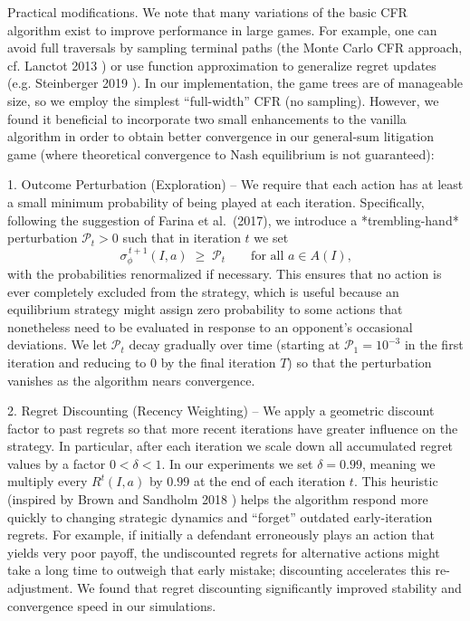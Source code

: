 \documentclass{article}
\begin{document}
Practical modifications. We note that many variations of the basic CFR algorithm exist to improve performance in large games. For example, one can avoid full traversals by sampling terminal paths (the Monte Carlo CFR approach, cf. Lanctot 2013 \cite{lanctot}) or use function approximation to generalize regret updates (e.g. Steinberger 2019 \cite{steinberger}). In our implementation, the game trees are of manageable size, so we employ the simplest “full-width” CFR (no sampling). However, we found it beneficial to incorporate two small enhancements to the vanilla algorithm in order to obtain better convergence in our general-sum litigation game (where theoretical convergence to Nash equilibrium is not guaranteed):

1. Outcome Perturbation (Exploration) – We require that each action has at least a small minimum probability of being played at each iteration.  Specifically, following the suggestion of Farina et al.\ (2017), we introduce a *trembling-hand* perturbation $\mathcal{P}_t>0$ such that in iteration $t$ we set 
   \[
   \sigma_{\phi}^{\,t+1}(I,a) \;\ge\; \mathcal{P}_t \qquad \text{for all $a \in A(I)$,}
   \] 
   with the probabilities renormalized if necessary.  This ensures that no action is ever completely excluded from the strategy, which is useful because an equilibrium strategy might assign zero probability to some actions that nonetheless need to be evaluated in response to an opponent’s occasional deviations. We let $\mathcal{P}_t$ decay gradually over time (starting at $\mathcal{P}_1 = 10^{-3}$ in the first iteration and reducing to $0$ by the final iteration $T$) so that the perturbation vanishes as the algorithm nears convergence.

2. Regret Discounting (Recency Weighting) – We apply a geometric discount factor to past regrets so that more recent iterations have greater influence on the strategy. In particular, after each iteration we scale down all accumulated regret values by a factor $0<\delta<1$. In our experiments we set $\delta=0.99$, meaning we multiply every $R^t(I,a)$ by $0.99$ at the end of each iteration $t$. This heuristic (inspired by Brown and Sandholm 2018 \cite{brownsandholm}) helps the algorithm respond more quickly to changing strategic dynamics and “forget” outdated early-iteration regrets. For example, if initially a defendant erroneously plays an action that yields very poor payoff, the undiscounted regrets for alternative actions might take a long time to outweigh that early mistake; discounting accelerates this re-adjustment. We found that regret discounting significantly improved stability and convergence speed in our simulations.
\end{document}
